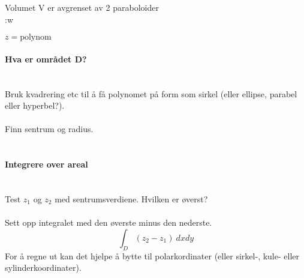 Volumet V er avgrenset av 2 paraboloider\\:w

$z = \text{polynom}$



\paragraph{Hva er området D?} \mbox{} \\
Bruk kvadrering etc til å få polynomet på form som
sirkel (eller ellipse, parabel eller hyperbel?). \\\\
Finn sentrum og radius.\\\\



\paragraph{Integrere over areal} \mbox{} \\
Test $z_1$ og $z_2$ med sentrumsverdiene. Hvilken er øverst?\\\\
Sett opp integralet med den øverste minus den nederste.
$$\int_D (z_2 - z_1) \: dx dy$$
For å regne ut kan det hjelpe å bytte til polarkordinater
(eller sirkel-, kule- eller sylinderkoordinater).

